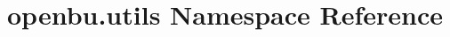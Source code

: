 \hypertarget{namespaceopenbu_1_1utils}{}\section{openbu.\+utils Namespace Reference}
\label{namespaceopenbu_1_1utils}
